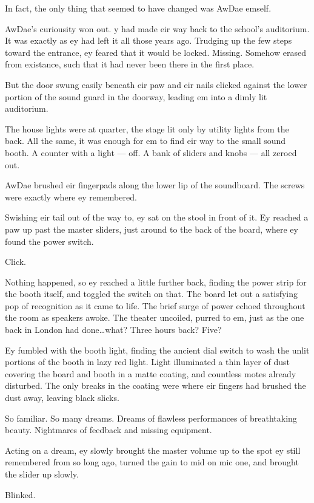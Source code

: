 In fact, the only thing that seemed to have changed was AwDae emself.

AwDae's curiousity won out. y had made eir way back to the school's auditorium. It was exactly as ey had left it all those years ago. Trudging up the few steps toward the entrance, ey feared that it would be locked. Missing. Somehow erased from existance, such that it had never been there in the first place.

But the door swung easily beneath eir paw and eir nails clicked against the lower portion of the sound guard in the doorway, leading em into a dimly lit auditorium.

The house lights were at quarter, the stage lit only by utility lights from the back. All the same, it was enough for em to find eir way to the small sound booth. A counter with a light --- off. A bank of sliders and knobs --- all zeroed out.

AwDae brushed eir fingerpads along the lower lip of the soundboard. The screws were exactly where ey remembered.

Swishing eir tail out of the way to, ey sat on the stool in front of it. Ey reached a paw up past the master sliders, just around to the back of the board, where ey found the power switch.

Click.

Nothing happened, so ey reached a little further back, finding the power strip for the booth itself, and toggled the switch on that. The board let out a satisfying pop of recognition as it came to life. The brief surge of power echoed throughout the room as speakers awoke. The theater uncoiled, purred to em, just as the one back in London had done\ldots{}what? Three hours back? Five?

Ey fumbled with the booth light, finding the ancient dial switch to wash the unlit portions of the booth in lazy red light. Light illuminated a thin layer of dust covering the board and booth in a matte coating, and countless motes already disturbed. The only breaks in the coating were where eir fingers had brushed the dust away, leaving black slicks.

So familiar. So many dreams. Dreams of flawless performances of breathtaking beauty. Nightmares of feedback and missing equipment.

Acting on a dream, ey slowly brought the master volume up to the spot ey still remembered from so long ago, turned the gain to mid on mic one, and brought the slider up slowly.

Blinked.

